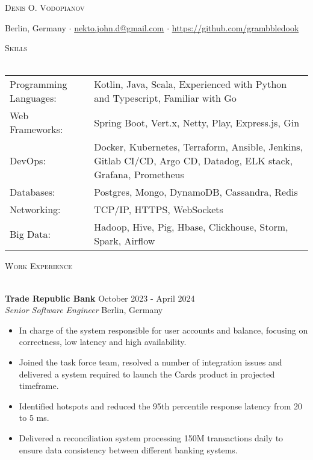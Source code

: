 \documentclass[a4paper]{article}
\makeatletter
\newcommand{\lineunder} {
    \vspace*{-8pt} \\
    \hspace*{-18pt} \hrulefill \\
}
\newcommand{\header} [1] {
        {\hspace*{-18pt}\vspace*{6pt} \textsc{#1}}
    \vspace*{-6pt} \lineunder
}
\newcommand{\employer} [4] {
    \textbf{#1} \hfill {#3} \\
    \textit{#2} \hfill {#4} \\
    \vspace{0mm}
}
\def\email{nekto.john.d@gmail.com}
\def\phone{555-55-55}
\makeatother
\begin{document}
    \vspace*{-40pt}


    \vspace*{-10pt}
    \begin{center}
        \Huge \scshape {Denis O. Vodopianov} \\ \vspace{1mm}
    \end{center}

    \begin{center}
        Berlin, Germany $\cdot$
        \href{mailto:\email}{\email} $\cdot$
        \url{https://github.com/grambbledook}\\
    \end{center}

    \header{Skills}
    \begin{tabular}{V{5cm} @{\hskip 0.6cm} V{16cm}}
        Programming Languages: & Kotlin, Java,  Scala, Experienced with Python and Typescript, Familiar with Go                                 \\
        Web Frameworks:        & Spring Boot, Vert.x, Netty, Play, Express.js, Gin                                                            \\
        DevOps:                & Docker, Kubernetes, Terraform, Ansible, Jenkins, Gitlab CI/CD, Argo CD, Datadog, ELK stack, Grafana, Prometheus \\
        Databases:             & Postgres, Mongo, DynamoDB, Cassandra, Redis                                                                         \\
        Networking:            & TCP/IP, HTTPS, WebSockets                                                                                    \\
        Big Data:              & Hadoop, Hive, Pig, Hbase, Clickhouse, Storm, Spark, Airflow                                                  \\
    \end{tabular}
    \vspace{2mm}


    \header{Work Experience}
    \vspace{1mm}

    \employer{Trade Republic Bank}{Senior Software Engineer}{October 2023 - April 2024}{Berlin, Germany}
    \begin{itemize}[itemsep=-1mm]
        \item In charge of the system responsible for user accounts and balance, focusing on correctness, low latency and high availability.
        \item Joined the task force team, resolved a number of integration issues and delivered a system required to launch the Cards product in projected timeframe.
        \item Identified hotspots and reduced the 95th percentile response latency from 20 to 5 ms.
        \item Delivered a reconciliation system processing 150M transactions daily to ensure data consistency between different banking systems.
    \end{itemize}
\end{document}

